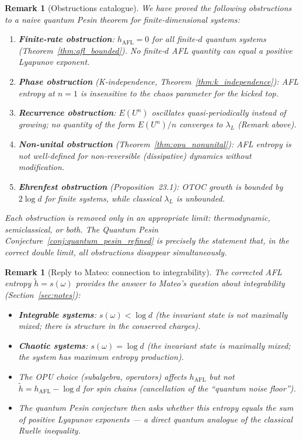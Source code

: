 \documentclass[12pt,a4paper]{article}
\newtheorem{remark}[theorem]{Remark}
\begin{document}
\begin{remark}[Obstructions catalogue]
We have proved the following obstructions to a naive quantum Pesin theorem for
finite-dimensional systems:
\begin{enumerate}
  \item \textbf{Finite-rate obstruction}: $h_{\mathrm{AFL}} = 0$ for all finite-$d$
        quantum systems (Theorem~\ref{thm:afl_bounded}).  No finite-$d$ AFL quantity
        can equal a positive Lyapunov exponent.
  \item \textbf{Phase obstruction} (K-independence, Theorem~\ref{thm:k_independence}):
        AFL entropy at $n=1$ is insensitive to the chaos parameter for the kicked top.
  \item \textbf{Recurrence obstruction}: $E(U^n)$ oscillates quasi-periodically
        instead of growing; no quantity of the form $E(U^n)/n$ converges to
        $\lambda_L$ (Remark above).
  \item \textbf{Non-unital obstruction} (Theorem~\ref{thm:opu_nonunital}):
        AFL entropy is not well-defined for non-reversible (dissipative) dynamics
        without modification.
  \item \textbf{Ehrenfest obstruction} (Proposition~23.1): OTOC growth is
        bounded by $2\log d$ for finite systems, while classical $\lambda_L$
        is unbounded.
\end{enumerate}
Each obstruction is removed only in an appropriate limit: thermodynamic,
semiclassical, or both.  The Quantum Pesin Conjecture~\ref{conj:quantum_pesin_refined}
is precisely the statement that, in the correct double limit, all obstructions
disappear simultaneously.
\end{remark}

\begin{remark}[Reply to Mateo: connection to integrability]
The corrected AFL entropy $\tilde{h} = s(\omega)$ provides the answer to Mateo's
question about integrability (Section~\ref{sec:notes}):
\begin{itemize}
  \item \textbf{Integrable systems}: $s(\omega) < \log d$ (the invariant state is not
        maximally mixed; there is structure in the conserved charges).
  \item \textbf{Chaotic systems}: $s(\omega) = \log d$ (the invariant state is maximally
        mixed; the system has maximum entropy production).
  \item The OPU choice (subalgebra, operators) affects $h_{\mathrm{AFL}}$ but not
        $\tilde{h} = h_{\mathrm{AFL}} - \log d$ for spin chains (cancellation of the
        ``quantum noise floor'').
  \item The quantum Pesin conjecture then asks whether this entropy equals the
        sum of positive Lyapunov exponents — a direct quantum analogue of the
        classical Ruelle inequality.
\end{itemize}
\end{remark}
\end{document}
